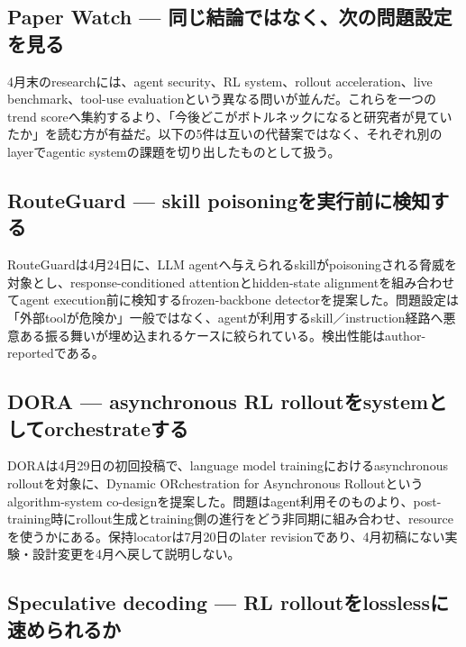 \begingroup\raggedright
\subsection{Paper Watch — 同じ結論ではなく、次の問題設定を見る}
\par\endgroup

4月末のresearchには、agent security、RL system、rollout acceleration、live benchmark、tool-use evaluationという異なる問いが並んだ。これらを一つのtrend scoreへ集約するより、「今後どこがボトルネックになると研究者が見ていたか」を読む方が有益だ。以下の5件は互いの代替案ではなく、それぞれ別のlayerでagentic systemの課題を切り出したものとして扱う。\autocite{src-0d99a9f2485e,src-56e226358d6f,src-6bd60c76cba7,src-841d4b563b9d,src-8e578daed9ed}


\begingroup\raggedright
\subsection{RouteGuard — skill poisoningを実行前に検知する}
\par\endgroup

RouteGuardは4月24日に、LLM agentへ与えられるskillがpoisoningされる脅威を対象とし、response-conditioned attentionとhidden-state alignmentを組み合わせてagent execution前に検知するfrozen-backbone detectorを提案した。問題設定は「外部toolが危険か」一般ではなく、agentが利用するskill／instruction経路へ悪意ある振る舞いが埋め込まれるケースに絞られている。検出性能はauthor-reportedである。\autocite{src-0d99a9f2485e}


\begingroup\raggedright
\subsection{DORA — asynchronous RL rolloutをsystemとしてorchestrateする}
\par\endgroup

DORAは4月29日の初回投稿で、language model trainingにおけるasynchronous rolloutを対象に、Dynamic ORchestration for Asynchronous Rolloutというalgorithm-system co-designを提案した。問題はagent利用そのものより、post-training時にrollout生成とtraining側の進行をどう非同期に組み合わせ、resourceを使うかにある。保持locatorは7月20日のlater revisionであり、4月初稿にない実験・設計変更を4月へ戻して説明しない。\autocite{src-6bd60c76cba7}


\begingroup\raggedright
\subsection{Speculative decoding — RL rolloutをlosslessに速められるか}
\par\endgroup

